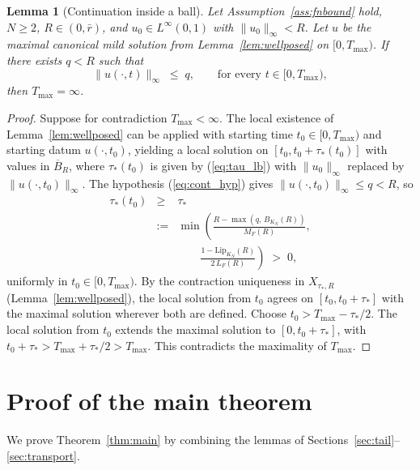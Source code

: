 \documentclass[amsthm]{autart}
\theoremstyle{plain}
\newtheorem{lemma}{Lemma}
\theoremstyle{definition}
\newcommand{\Linf}{L^\infty}
\newcommand{\LipKn}{\mathrm{Lip}_{K_N}}
\begin{document}
\begin{lemma}[Continuation inside a ball]\label{lem:continuation}
Let Assumption~\ref{ass:fnbound} hold, $N \ge 2$, $R \in (0, \bar r)$, and $u_0 \in \Linf(0,1)$ with $\|u_0\|_\infty < R$. Let $u$ be the maximal canonical mild solution from Lemma~\ref{lem:wellposed} on $[0, T_{\max})$. If there exists $q < R$ such that
\begin{equation}
\|u(\cdot, t)\|_\infty \;\le\; q, \qquad \text{for every } t \in [0, T_{\max}),
\label{eq:cont_hyp}
\end{equation}
then $T_{\max} = \infty$.
\end{lemma}

\begin{proof}
Suppose for contradiction $T_{\max} < \infty$. The local existence of Lemma~\ref{lem:wellposed} can be applied with starting time $t_0 \in [0, T_{\max})$ and starting datum $u(\cdot, t_0)$, yielding a local solution on $[t_0, t_0 + \tau_*(t_0)]$ with values in $\overline B_R$, where $\tau_*(t_0)$ is given by (\ref{eq:tau_lb}) with $\|u_0\|_\infty$ replaced by $\|u(\cdot, t_0)\|_\infty$. The hypothesis (\ref{eq:cont_hyp}) gives $\|u(\cdot, t_0)\|_\infty \le q < R$, so
\begin{eqnarray}
\tau_*(t_0) &\ge& \tau_* \nonumber \\
&:=& \min\!\left(\frac{R - \max(q,\, B_{K_N}(R))}{M_F(R)},\right. \nonumber \\
&& \quad\quad \left.\frac{1 - \LipKn(R)}{2\, L_F(R)}\right) \;>\; 0,
\label{eq:tau_uniform_lb}
\end{eqnarray}
uniformly in $t_0 \in [0, T_{\max})$. By the contraction uniqueness in $X_{\tau_*, R}$ (Lemma~\ref{lem:wellposed}), the local solution from $t_0$ agrees on $[t_0, t_0 + \tau_*]$ with the maximal solution wherever both are defined. Choose $t_0 > T_{\max} - \tau_*/2$. The local solution from $t_0$ extends the maximal solution to $[0, t_0 + \tau_*]$, with $t_0 + \tau_* > T_{\max} + \tau_*/2 > T_{\max}$. This contradicts the maximality of $T_{\max}$.
\end{proof}

\section{Proof of the main theorem}\label{sec:mainproof}

We prove Theorem~\ref{thm:main} by combining the lemmas of Sections~\ref{sec:tail}--\ref{sec:transport}.
\end{document}
